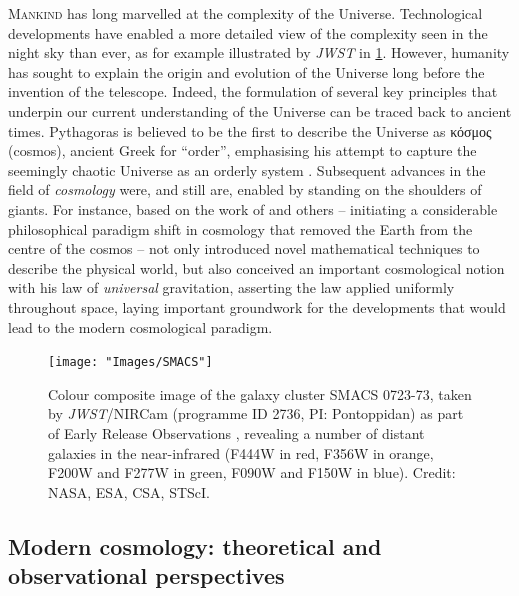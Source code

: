 \lettrine{M}{ankind} has long marvelled at the complexity of the Universe. Technological developments have enabled a more detailed view of the complexity seen in the night sky than ever, as for example illustrated by \textit{JWST} in \cref{chIfig:SMACS}. However, humanity has sought to explain the origin and evolution of the Universe long before the invention of the telescope. Indeed, the formulation of several key principles that underpin our current understanding of the Universe can be traced back to ancient times. Pythagoras is believed to be the first to describe the Universe as \textgreek{κόσμος} (cosmos), ancient Greek for ``order'', emphasising his attempt to capture the seemingly chaotic Universe as an orderly system \citep[e.g.][]{1860Humboldt}. Subsequent advances in the field of \textit{cosmology} were, and still are, enabled by standing on the shoulders of giants. For instance, based on the work of \citet{Copernicus1543} and others -- initiating a considerable philosophical paradigm shift in cosmology that removed the Earth from the centre of the cosmos -- \citet{Newton1687} not only introduced novel mathematical techniques to describe the physical world, but also conceived an important cosmological notion with his law of \textit{universal} gravitation, asserting the law applied uniformly throughout space, laying important groundwork for the developments that would lead to the modern cosmological paradigm.
\begin{figure}
    \centering
    \texttt{[image: "Images/SMACS"]}
    \caption[Colour composite image of the galaxy cluster SMACS 0723-73.]{Colour composite image of the galaxy cluster SMACS 0723-73, taken by \textit{JWST}/NIRCam (programme ID 2736, PI: Pontoppidan) as part of Early Release Observations \citep[EROs;][]{2022arXiv220713067P}, revealing a number of distant galaxies in the near-infrared (F444W in red, F356W in orange, F200W and F277W in green, F090W and F150W in blue). Credit: NASA, ESA, CSA, STScI.}
    \label{chIfig:SMACS}
\end{figure}

\subsection{Modern cosmology: theoretical and observational perspectives}
\label{chIssec:Modern_cosmology}

